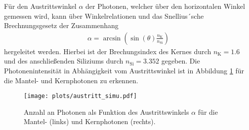 Für den Austrittswinkel $\alpha$ der Photonen, welcher über den horizontalen Winkel gemessen wird, kann über Winkelrelationen und das Snellius´sche Brechnungsgesetz der Zusammenhang
\begin{align}
    \alpha = \arcsin \left( \sin(\theta)\frac{n_\mathrm{K}}{n_\mathrm{Si}}\right)
\end{align} 
hergeleitet werden. Hierbei ist der Brechungsindex des Kernes durch $n_\mathrm{K} = 1.6$ \cite{anleitung} und des anschließenden Siliziums durch $n_\mathrm{Si} = 3.352$ \cite{si} gegeben.
Die Photonenintensität in Abhängigkeit vom Austrittswinkel ist in Abbildung \ref{fig:austritt_simu} für die Mantel- und Kernphotonen zu erkennen.
\begin{figure}
    \centering
    \texttt{[image: plots/austritt\_simu.pdf]}
    \caption{Anzahl an Photonen als Funktion des Austrittswinkels $\alpha$ für die Mantel- (links) und Kernphotonen (rechts). }
    \label{fig:austritt_simu}
\end{figure}
\FloatBarrier

